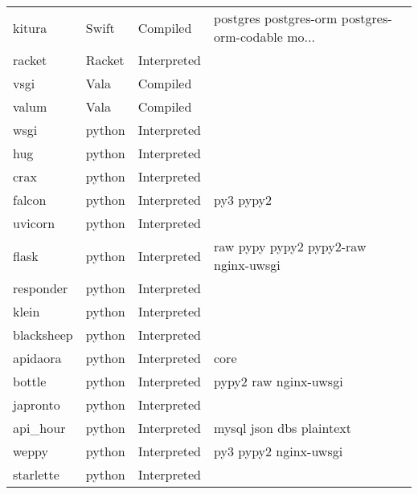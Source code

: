 \begin{longtable}{llll}
    kitura           & Swift & Compiled       & postgres postgres-orm postgres-orm-codable mo...   \\
    racket           & Racket & Interpreted      &                                                    \\
    vsgi             & Vala & Compiled        &                                                    \\
    valum            & Vala & Compiled        &                                                    \\
    wsgi             & python & Interpreted     &                                                    \\
    hug              & python & Interpreted     &                                                    \\
    crax             & python & Interpreted     &                                                    \\
    falcon           & python & Interpreted     & py3 pypy2                                          \\
    uvicorn          & python & Interpreted     &                                                    \\
    flask            & python & Interpreted     & raw pypy pypy2 pypy2-raw nginx-uwsgi               \\
    responder        & python & Interpreted     &                                                    \\
    klein            & python & Interpreted     &                                                    \\
    blacksheep       & python & Interpreted     &                                                    \\
    apidaora         & python & Interpreted     & core                                               \\
    bottle           & python & Interpreted     & pypy2 raw nginx-uwsgi                              \\
    japronto         & python & Interpreted     &                                                    \\
    api\_hour        & python & Interpreted     & mysql json dbs plaintext                           \\
    weppy            & python & Interpreted     & py3 pypy2 nginx-uwsgi                              \\
    starlette        & python & Interpreted     &                                                    \\

\end{longtable}
